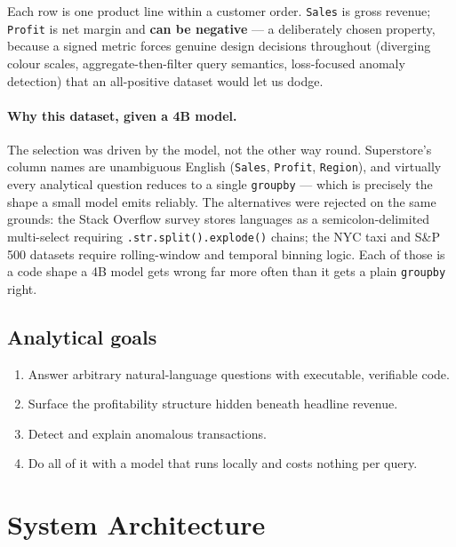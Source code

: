 \documentclass[11pt,a4paper]{article}
\begin{document}
Each row is one product line within a customer order. \texttt{Sales} is gross
revenue; \texttt{Profit} is net margin and \textbf{can be negative} --- a
deliberately chosen property, because a signed metric forces genuine design decisions
throughout (diverging colour scales, aggregate-then-filter query semantics,
loss-focused anomaly detection) that an all-positive dataset would let us dodge.

\paragraph{Why this dataset, given a 4B model.} The selection was driven by the
model, not the other way round. Superstore's column names are unambiguous English
(\texttt{Sales}, \texttt{Profit}, \texttt{Region}), and virtually every analytical
question reduces to a single \texttt{groupby} --- which is precisely the shape a small
model emits reliably. The alternatives were rejected on the same grounds: the Stack
Overflow survey stores languages as a semicolon-delimited multi-select requiring
\texttt{.str.split().explode()} chains; the NYC taxi and S\&P 500 datasets require
rolling-window and temporal binning logic. Each of those is a code shape a 4B model
gets wrong far more often than it gets a plain \texttt{groupby} right.

\subsection{Analytical goals}

\begin{enumerate}[leftmargin=*]
\item Answer arbitrary natural-language questions with executable, verifiable code.
\item Surface the profitability structure hidden beneath headline revenue.
\item Detect and explain anomalous transactions.
\item Do all of it with a model that runs locally and costs nothing per query.
\end{enumerate}

\section{System Architecture}
\end{document}
